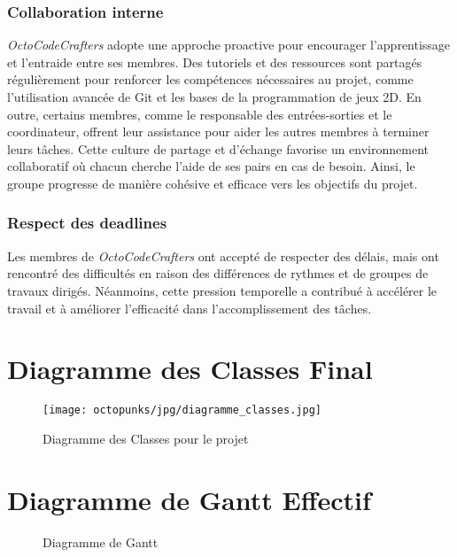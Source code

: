 \documentclass{article}
\begin{document}
\subsubsection{Collaboration interne}
\textit{OctoCodeCrafters} adopte une approche proactive pour encourager l'apprentissage et l'entraide entre ses membres. Des tutoriels et des ressources sont partagés régulièrement pour renforcer les compétences nécessaires au projet, comme l'utilisation avancée de Git et les bases de la programmation de jeux 2D. En outre, certains membres, comme le responsable des entrées-sorties et le coordinateur, offrent leur assistance pour aider les autres membres à terminer leurs tâches. Cette culture de partage et d'échange favorise un environnement collaboratif où chacun cherche l'aide de ses pairs en cas de besoin. Ainsi, le groupe progresse de manière cohésive et efficace vers les objectifs du projet.
\subsubsection{Respect des deadlines}
Les membres de \textit{OctoCodeCrafters} ont accepté de respecter des délais, mais ont rencontré des difficultés en raison des différences de rythmes et de groupes de travaux dirigés. Néanmoins, cette pression temporelle a contribué à accélérer le travail et à améliorer l'efficacité dans l'accomplissement des tâches.


\section{Diagramme des Classes Final}
\begin{figure}[h]
    \centering
    \texttt{[image: octopunks/jpg/diagramme\_classes.jpg]}
    \caption{Diagramme des Classes pour le projet}
\end{figure}

\section{Diagramme de Gantt Effectif}
\begin{figure}[h]
    \centering
	
	\caption{Diagramme de Gantt}
\end{figure}
\clearpage
\end{document}
